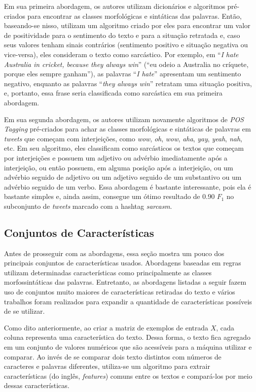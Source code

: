 Em sua primeira abordagem, os autores utilizam dicionários e algoritmos
pré-criados para encontrar as classes morfológicas e sintáticas das palavras.
Então, baseando-se nisso, utilizam um algoritmo criado por eles para
encontrar um valor de positividade para o sentimento do texto e para a situação
retratada e, caso seus valores tenham sinais contrários (sentimento positivo e
situação negativa ou vice-versa), eles consideram o texto como sarcástico. Por
exemplo, em ``\textit{I hate Australia in cricket, because they always win}''
(``eu odeio a Australia no críquete, porque eles sempre ganham''), as palavras
``\textit{I hate}'' apresentam um sentimento negativo, enquanto as palavras
``\textit{they always win}'' retratam uma situação positiva, e, portanto, essa
frase seria classificada como sarcástica em sua primeira abordagem.

Em sua segunda abordagem, os autores utilizam novamente algoritmos de
\textit{POS Tagging} pré-criados para achar as classes morfológicas e sintáticas
de palavras em \textit{tweets} que começam com interjeições, como \textit{wow},
\textit{oh}, \textit{wow}, \textit{aha}, \textit{yay}, \textit{yeah},
\textit{nah}, etc. Em seu algoritmo, eles classificam como sarcásticos os textos
que começam por interjeições e possuem um adjetivo ou advérbio imediatamente
após a interjeição, ou então possuem, em alguma posição após a interjeição, ou um
advérbio seguido de adjetivo ou um adjetivo seguido de um substantivo ou um
advérbio seguido de um verbo. Essa abordagem é bastante interessante, pois ela é
bastante simples e, ainda assim, consegue um ótimo resultado de 0.90 $F_1$ no
subconjunto de \textit{tweets} marcado com a hashtag \textit{sarcasm}.

\subsection{Conjuntos de Características}%
\label{sub:conjuntos-de-caracteristicas}

Antes de prosseguir com as abordagens, essa seção mostra um pouco dos
principais conjuntos de características usados. Abordagens
baseadas em regras utilizam determinadas características como principalmente as
classes morfossintáticas das palavras. Entretanto, as abordagens listadas a
seguir fazem uso de conjuntos muito maiores de características retiradas do
texto e vários trabalhos foram realizados para expandir a quantidade de
características possíveis de se utilizar.

Como dito anteriormente, ao criar a matriz de exemplos de entrada $X$, cada
coluna representa uma característica do texto. Dessa forma, o texto fica
agregado em um conjunto de valores numéricos que são acessíveis para a máquina
utilizar e comparar. Ao invés de se comparar dois texto distintos com números de
caracteres e palavras diferentes, utiliza-se um algoritmo para extrair
características (do inglês, \textit{features}) comuns entre os textos e
compará-los por meio dessas características.

